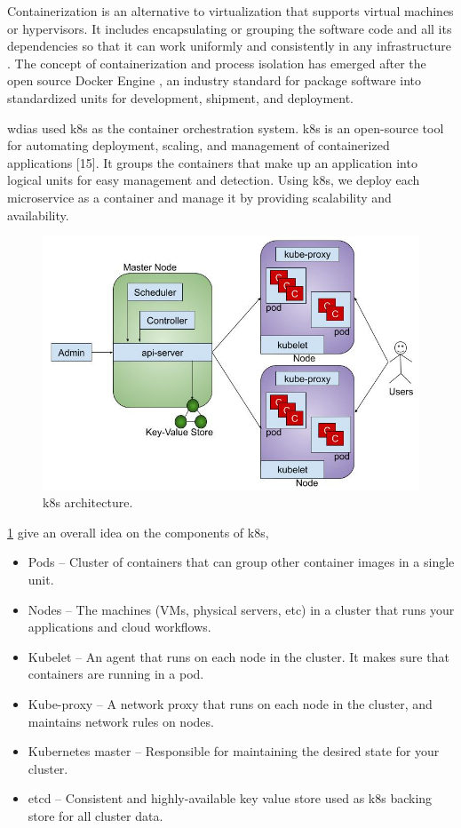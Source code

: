 Containerization is an alternative to virtualization that supports virtual machines or hypervisors. It includes encapsulating or grouping the software code and all its dependencies so that it can work uniformly and consistently in any infrastructure \cite{IBMContainerizationExplained}. The concept of containerization and process isolation has emerged after the open source Docker Engine \cite{DockerAppContainerization}, an industry standard for package software into standardized units for development, shipment, and deployment.

\acrshort{wdias} used \acrfull{k8s} as the container orchestration system. \acrshort{k8s} is an open-source tool for automating deployment, scaling, and management of containerized applications [15]. It groups the containers that make up an application into logical units for easy management and detection. Using \acrshort{k8s}, we deploy each microservice as a container and manage it by providing scalability and availability.

\begin{figure}[htp]
    \centering
    \includegraphics[width=1\textwidth]{method/microservice/k8s_architecture_v3.jpg}
    \caption{\acrfull{k8s} architecture.}
    \label{fi:k8s_architecture}
\end{figure}

\cref{fi:k8s_architecture} give an overall idea on the components of \acrshort{k8s},
\begin{itemize}
    \item Pods -- Cluster of containers that can group other container images in a single unit.
    \item Nodes -- The machines (VMs, physical servers, etc) in a cluster that runs your applications and cloud workflows.
    \item Kubelet -- An agent that runs on each node in the cluster. It makes sure that containers are running in a pod.
    \item Kube-proxy -- A network proxy that runs on each node in the cluster, and maintains network rules on nodes.
    \item Kubernetes master -- Responsible for maintaining the desired state for your cluster.
    \item etcd -- Consistent and highly-available key value store used as \acrshort{k8s} backing store for all cluster data.
\end{itemize}

